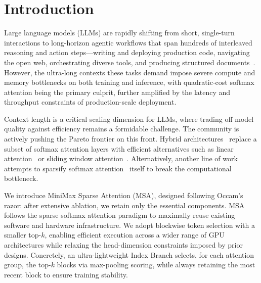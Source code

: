 \documentclass{llmxive}
\begin{document}
\section{Introduction}
\label{sec:introduction}

Large language models (LLMs) are rapidly shifting from short, single-turn interactions to long-horizon agentic workflows that span hundreds of interleaved reasoning and action steps—writing and deploying production code, navigating the open web, orchestrating diverse tools, and producing structured documents~\citep{openai2025gpt5,anthropic2025claude46,google2025gemini31,deepseekai2026v4,moonshot2026kimi26,zhipu2026glm51}. However, the ultra-long contexts these tasks demand impose severe compute and memory bottlenecks on both training and inference, with quadratic-cost softmax attention being the primary culprit, further amplified by the latency and throughput constraints of production-scale deployment.

Context length is a critical scaling dimension for LLMs, where trading off model quality against efficiency remains a formidable challenge. The community is actively pushing the Pareto frontier on this front. Hybrid architectures~\citep{minimaxm1,qwen35blog} replace a subset of softmax attention layers with efficient alternatives such as linear attention~\citep{kimiteam2025kimilinearexpressiveefficient,yang2025gateddeltanetworksimproving,gu2023mamba} or sliding window attention~\citep{openai2025gptoss120bgptoss20bmodel,coreteam2026mimov2flashtechnicalreport}.  Alternatively, another line of work attempts to sparsify softmax attention~\citep{deepseekai2025deepseekv32pushingfrontieropen,deepseekai2026v4,minicpmteam2025minicpm4ultraefficientllmsend,lu2025mobamixtureblockattention} itself to break the computational bottleneck.

We introduce MiniMax Sparse Attention (MSA), designed following Occam's razor: after extensive ablation, we retain only the essential components. MSA follows the sparse softmax attention paradigm to maximally reuse existing software and hardware infrastructure. 
We adopt blockwise token selection with a smaller top-$k$, enabling efficient execution across a wider range of GPU architectures while relaxing the head-dimension constraints imposed by prior designs. Concretely, an ultra-lightweight Index Branch selects, for each attention group, the top-$k$ blocks via max-pooling scoring, while always retaining the most recent block to ensure training stability. 
\end{document}
